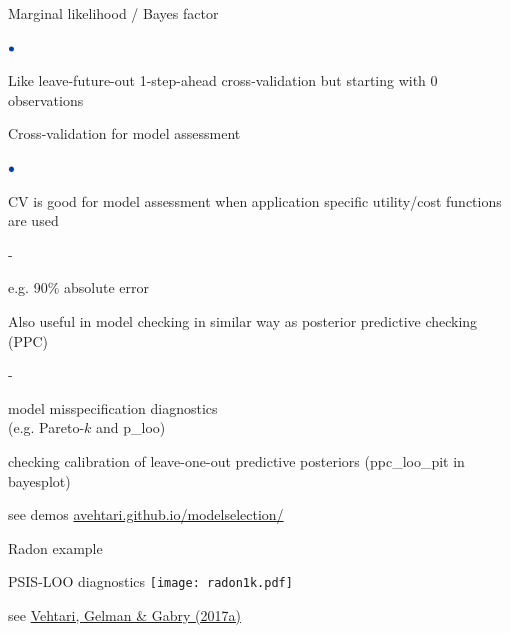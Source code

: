 \documentclass[english,t]{beamer}
\newenvironment{list1}{
   \begin{list}{$\color{list1}\bullet$}{\itemsep=6pt}}{
  \end{list}}
\newenvironment{list2}{
  \begin{list}{-}{\baselineskip=12pt\itemsep=2pt}}{
  \end{list}}
\begin{document}
\begin{frame}{Marginal likelihood / Bayes factor}

\vspace{-0.3\baselineskip}
\begin{list1}
\item Like leave-future-out 1-step-ahead cross-validation but starting with 0 observations\\
\end{list1}
\vspace{-0.5\baselineskip}

\end{frame}

\begin{frame}{Cross-validation for model assessment}

\begin{list1}
\item CV is good for model assessment when application specific utility/cost functions are used
  \begin{list2}
  \item e.g. 90\% absolute error
  \end{list2}
\item<2-> Also useful in model checking in similar way as posterior
  predictive checking (PPC)
  \begin{list2}
  \item model misspecification diagnostics\\ (e.g. Pareto-$k$ and p\_loo)
  \item checking calibration of leave-one-out predictive posteriors
    (ppc\_loo\_pit in bayesplot)
  \end{list2}
  {\small see demos \url{avehtari.github.io/modelselection/}}
\end{list1}

\end{frame}

\begin{frame}{Radon example}

   PSIS-LOO diagnostics
   \texttt{[image: radon1k.pdf]}

{\small see \href{http://link.springer.com/article/10.1007/s11222-016-9696-4}{Vehtari, Gelman \& Gabry (2017a)}}
   
 \end{frame}
\end{document}
